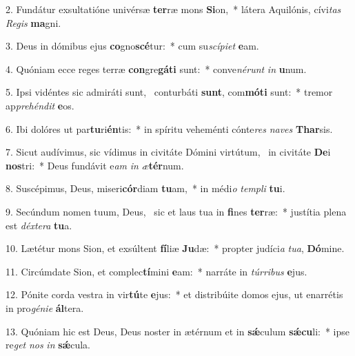 2. Fundátur exsultatióne univérsæ \textbf{ter}ræ mons \textbf{Si}on,~*  látera Aquilónis, cívi\textit{tas} \textit{Re}\textit{gis} \textbf{ma}gni.\

3. Deus in dómibus ejus \textbf{co}gno\textbf{scé}tur:~*  cum su\textit{scí}\textit{pi}\textit{et} \textbf{e}am.\

4. Quóniam ecce reges terræ \textbf{con}gre\textbf{gá}\textbf{ti} sunt:~*  conve\textit{né}\textit{runt} \textit{in} \textbf{u}num.\

5. Ipsi vidéntes sic admiráti sunt, \dag\  conturbáti \textbf{sunt}, com\textbf{mó}\textbf{ti} sunt:~*  tremor ap\textit{pre}\textit{hén}\textit{dit} \textbf{e}os.\

6. Ibi dolóres ut par\textbf{tu}ri\textbf{én}tis:~*  in spíritu veheménti cónte\textit{res} \textit{na}\textit{ves} \textbf{Thar}sis.\

7. Sicut audívimus, sic vídimus in civitáte Dómini virtútum, \dag\  in civitáte \textbf{De}i \textbf{nos}tri:~*  Deus fundávit e\textit{am} \textit{in} \textit{æ}\textbf{tér}num.\

8. Suscépimus, Deus, miseri\textbf{cór}diam \textbf{tu}am,~*  in médi\textit{o} \textit{tem}\textit{pli} \textbf{tu}i.\

9. Secúndum nomen tuum, Deus, \dag\  sic et laus tua in \textbf{fi}nes \textbf{ter}ræ:~*  justítia plena est \textit{déx}\textit{te}\textit{ra} \textbf{tu}a.\

10. Lætétur mons Sion, et exsúltent \textbf{fí}liæ \textbf{Ju}dæ:~*  propter judíci\textit{a} \textit{tu}\textit{a}, \textbf{Dó}mine.\

11. Circúmdate Sion, et complec\textbf{tí}mini \textbf{e}am:~*  narráte in \textit{túr}\textit{ri}\textit{bus} \textbf{e}jus.\

12. Pónite corda vestra in vir\textbf{tú}te \textbf{e}jus:~*  et distribúite domos ejus, ut enarrétis in pro\textit{gé}\textit{ni}\textit{e} \textbf{ál}tera.\

13. Quóniam hic est Deus, Deus noster in ætérnum et in \textbf{sǽ}culum \textbf{sǽ}\textbf{cu}li:~*  ipse re\textit{get} \textit{nos} \textit{in} \textbf{sǽ}cula.\

